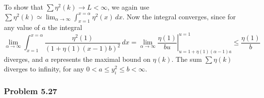 \documentclass[12pt, a4paper]{article}
\begin{document}
\begin{easylist}[enumerate]
To show that $\sum \eta^2(k) \to L < \infty$, we again use $\sum \eta^2(k) \simeq \lim_{\alpha \to \infty} \int_{x=1}^{x=\alpha} \eta^2(x) \, dx $.
Now the integral converges, since for any value of $a$ the integral
\begin{equation*}
\lim_{\alpha \to \infty} \int_{x=1}^{x=\alpha} \frac{\eta^2(1)}{(1 + \eta(1)(x-1)b)^2} \, dx 
= 
\lim_{\alpha \to \infty} \left. \frac{\eta(1)}{bu} \right|_{u=1 + \eta(1) (\alpha - 1)a}^{u=1} \leq \frac{\eta(1)}{b}
\end{equation*}
diverges, and $a$ represents the maximal bound on $\eta(k)$. 
The sum $\sum \eta(k)$ diverges to infinity, for any $0 < a \leq y_i^2 \leq b < \infty$.
\end{easylist}




\subsubsection*{Problem 5.27}
\end{document}
